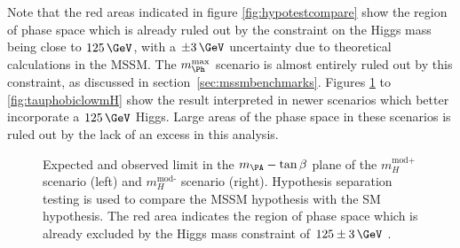 Note that the red areas indicated in figure \ref{fig:hypotestcompare} show the
region of phase space which is already ruled out by the constraint on the Higgs
mass being close to $125\,\GeV$, with a $\pm 3\,\GeV$ uncertainty due to
theoretical calculations in the \ac{MSSM}. The $m_{\Ph}^{\text{max}}$ scenario
is almost entirely ruled out by this constraint, as discussed in
section~\ref{sec:mssmbenchmarks}. Figures \ref{fig:mhmodpmhmodm} to \ref{fig:tauphobiclowmH}
show the result interpreted in newer scenarios which better incorporate a
$125\,\GeV$ Higgs. Large areas of the phase space in these scenarios is ruled out
by the lack of an excess in this analysis.


\begin{figure}[tbh]
\caption[Expected and observed limit in the $m_{\PA}-\tan\beta$ plane of the
$m_H^{\text{mod+}}$ scenario (left) and $m_H^{\text{mod-}}$ scenario (right).]
{Expected and observed limit in the $m_{\PA}-\tan\beta$ plane of the
$m_H^{\text{mod+}}$ scenario (left) and $m_H^{\text{mod-}}$ scenario (right). Hypothesis
separation testing is used to compare the \ac{MSSM} hypothesis with the SM
hypothesis. The red area indicates the region of phase space which is already
excluded by the Higgs mass constraint of $125\pm3\,\GeV$ \cite{HIG-13-021}.}
\label{fig:mhmodpmhmodm}
\end{figure}


